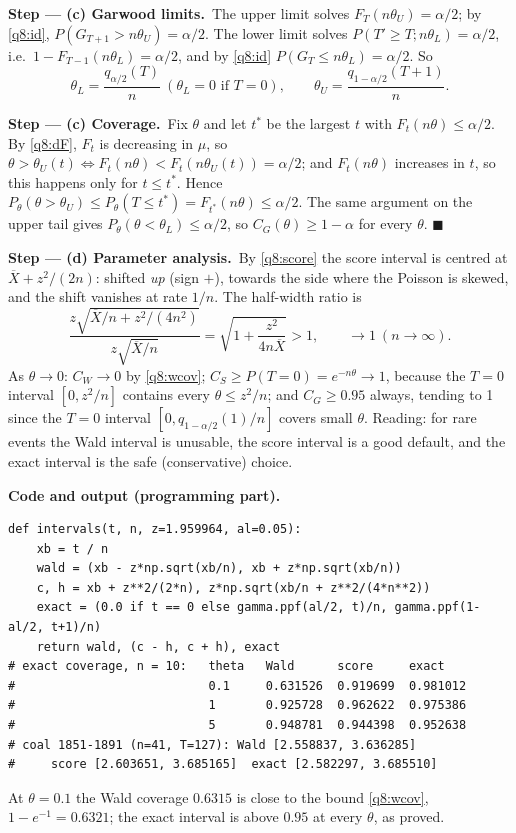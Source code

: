 \documentclass[11pt,a4paper]{article}
\numberwithin{equation}{questao}   %
\newcommand{\passo}[2]{\par\smallskip\noindent\textbf{Step --- #1.}~#2}
\newcommand{\codehead}{\par\smallskip\noindent\textbf{Code and output (programming part).}\par}
\newcommand{\1}{\mathbf{1}}
\begin{document}
\begin{sol}
\passo{(c) Garwood limits}{The upper limit solves $F_T(n\theta_U)=\alpha/2$; by \eqref{q8:id},
$P(G_{T+1}>n\theta_U)=\alpha/2$. The lower limit solves $P(T'\ge T;n\theta_L)=\alpha/2$, i.e.\
$1-F_{T-1}(n\theta_L)=\alpha/2$, and by \eqref{q8:id} $P(G_T\le n\theta_L)=\alpha/2$. So}
\begin{equation}\label{q8:gar}
\theta_L=\frac{q_{\alpha/2}(T)}{n}\ (\theta_L=0\text{ if }T=0),\qquad \theta_U=\frac{q_{1-\alpha/2}(T+1)}{n}.
\end{equation}

\passo{(c) Coverage}{Fix $\theta$ and let $t^*$ be the largest $t$ with $F_t(n\theta)\le\alpha/2$.
By \eqref{q8:dF}, $F_t$ is decreasing in $\mu$, so $\theta>\theta_U(t)\iff F_t(n\theta)<F_t(n\theta_U(t))=\alpha/2$;
and $F_t(n\theta)$ increases in $t$, so this happens only for $t\le t^*$. Hence
$P_\theta(\theta>\theta_U)\le P_\theta(T\le t^*)=F_{t^*}(n\theta)\le\alpha/2$. The same argument on the
upper tail gives $P_\theta(\theta<\theta_L)\le\alpha/2$, so $C_{G}(\theta)\ge1-\alpha$ for every
$\theta$. $\blacksquare$}

\passo{(d) Parameter analysis}{By \eqref{q8:score} the score interval is centred at
$\overline X+z^2/(2n)$: shifted \emph{up} (sign $+$), towards the side where the Poisson is
skewed, and the shift vanishes at rate $1/n$. The half-width ratio is}
\begin{equation}\label{q8:ratio}
\frac{z\sqrt{\overline X/n+z^2/(4n^2)}}{z\sqrt{\overline X/n}}=\sqrt{1+\frac{z^2}{4n\overline X}}>1,
\qquad\to1\ (n\to\infty).
\end{equation}
As $\theta\to0$: $C_W\to0$ by \eqref{q8:wcov}; $C_S\ge P(T=0)=e^{-n\theta}\to1$, because the $T=0$
interval $[0,z^2/n]$ contains every $\theta\le z^2/n$; and $C_G\ge0.95$ always, tending to 1 since
the $T=0$ interval $[0,q_{1-\alpha/2}(1)/n]$ covers small $\theta$. Reading: for rare events the
Wald interval is unusable, the score interval is a good default, and the exact interval is the safe
(conservative) choice.

\codehead
{\small
\begin{verbatim}
def intervals(t, n, z=1.959964, al=0.05):
    xb = t / n
    wald = (xb - z*np.sqrt(xb/n), xb + z*np.sqrt(xb/n))
    c, h = xb + z**2/(2*n), z*np.sqrt(xb/n + z**2/(4*n**2))
    exact = (0.0 if t == 0 else gamma.ppf(al/2, t)/n, gamma.ppf(1-al/2, t+1)/n)
    return wald, (c - h, c + h), exact
# exact coverage, n = 10:   theta   Wald      score     exact
#                           0.1     0.631526  0.919699  0.981012
#                           1       0.925728  0.962622  0.975386
#                           5       0.948781  0.944398  0.952638
# coal 1851-1891 (n=41, T=127): Wald [2.558837, 3.636285]
#     score [2.603651, 3.685165]  exact [2.582297, 3.685510]
\end{verbatim}
}
At $\theta=0.1$ the Wald coverage $0.6315$ is close to the bound \eqref{q8:wcov},
$1-e^{-1}=0.6321$; the exact interval is above $0.95$ at every $\theta$, as proved.


\end{sol}
\end{document}
